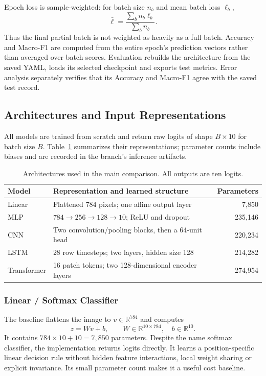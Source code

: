 Epoch loss is sample-weighted: for batch size $n_b$ and mean batch loss $\ell_b$,
\begin{equation}
\bar\ell=\frac{\sum_b n_b\ell_b}{\sum_b n_b}.
\end{equation}
Thus the final partial batch is not weighted as heavily as a full batch. Accuracy and Macro-F1 are computed from the entire epoch's prediction vectors rather than averaged over batch scores. Evaluation rebuilds the architecture from the saved YAML, loads its selected checkpoint and exports test metrics. Error analysis separately verifies that its Accuracy and Macro-F1 agree with the saved test record.

\subsection{Architectures and Input Representations}
All models are trained from scratch and return raw logits of shape $B\times10$ for batch size $B$. Table~\ref{tab:architectures} summarizes their representations; parameter counts include biases and are recorded in the branch's inference artifacts.
\begin{table}[!htbp]\centering\small
\caption{Architectures used in the main comparison. All outputs are ten logits.}
\label{tab:architectures}
\begin{tabularx}{\linewidth}{@{}lXr@{}}\toprule
Model & Representation and learned structure & Parameters\\\midrule
Linear & Flattened 784 pixels; one affine output layer & 7,850\\
MLP & $784\to256\to128\to10$; ReLU and dropout & 235,146\\
CNN & Two convolution/pooling blocks, then a 64-unit head & 220,234\\
LSTM & 28 row timesteps; two layers, hidden size 128 & 214,282\\
Transformer & 16 patch tokens; two 128-dimensional encoder layers & 274,954\\\bottomrule
\end{tabularx}\end{table}

\subsubsection{Linear / Softmax Classifier}
The baseline flattens the image to $v\in\mathbb R^{784}$ and computes
\begin{equation}
z=Wv+b,\qquad W\in\mathbb R^{10\times784},\quad b\in\mathbb R^{10}.
\end{equation}
It contains $784\times10+10=7{,}850$ parameters. Despite the name softmax classifier, the implementation returns logits directly. It learns a position-specific linear decision rule without hidden feature interactions, local weight sharing or explicit invariance. Its small parameter count makes it a useful cost baseline.


